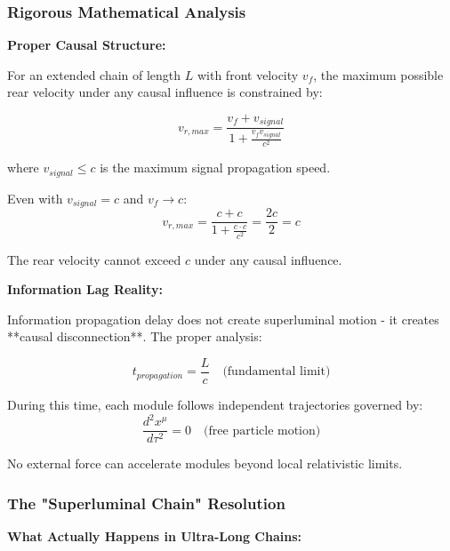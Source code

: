 \documentclass[11pt,a4paper]{article}
\theoremstyle{remark}
\begin{document}
\subsubsection{Rigorous Mathematical Analysis}

\textbf{Proper Causal Structure:}

For an extended chain of length $L$ with front velocity $v_f$, the maximum possible rear velocity under any causal influence is constrained by:

\begin{equation}
v_{r,max} = \frac{v_f + v_{signal}}{1 + \frac{v_f v_{signal}}{c^2}}
\label{eq:causal_velocity_limit}
\end{equation}

where $v_{signal} \leq c$ is the maximum signal propagation speed.

Even with $v_{signal} = c$ and $v_f \to c$:
\begin{equation}
v_{r,max} = \frac{c + c}{1 + \frac{c \cdot c}{c^2}} = \frac{2c}{2} = c
\label{eq:velocity_limit_proof}
\end{equation}

The rear velocity cannot exceed $c$ under any causal influence.

\textbf{Information Lag Reality:}

Information propagation delay does not create superluminal motion - it creates **causal disconnection**. The proper analysis:

\begin{equation}
t_{propagation} = \frac{L}{c} \quad \text{(fundamental limit)}
\label{eq:propagation_time}
\end{equation}

During this time, each module follows independent trajectories governed by:
\begin{equation}
\frac{d^2x^\mu}{d\tau^2} = 0 \quad \text{(free particle motion)}
\label{eq:independent_motion}
\end{equation}

No external force can accelerate modules beyond local relativistic limits.

\subsubsection{The "Superluminal Chain" Resolution}

\textbf{What Actually Happens in Ultra-Long Chains:}
\end{document}
